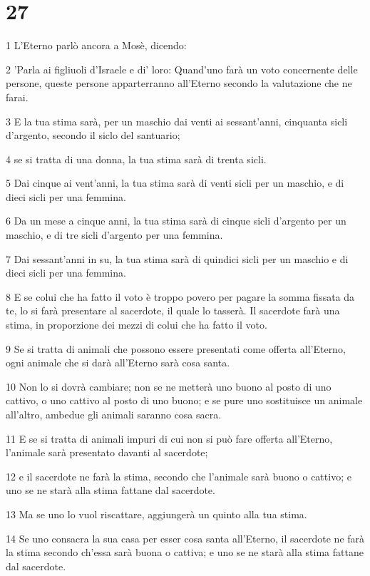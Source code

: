 \chapter{27}

\par 1 L'Eterno parlò ancora a Mosè, dicendo:
\par 2 'Parla ai figliuoli d'Israele e di' loro: Quand'uno farà un voto concernente delle persone, queste persone apparterranno all'Eterno secondo la valutazione che ne farai.
\par 3 E la tua stima sarà, per un maschio dai venti ai sessant'anni, cinquanta sicli d'argento, secondo il siclo del santuario;
\par 4 se si tratta di una donna, la tua stima sarà di trenta sicli.
\par 5 Dai cinque ai vent'anni, la tua stima sarà di venti sicli per un maschio, e di dieci sicli per una femmina.
\par 6 Da un mese a cinque anni, la tua stima sarà di cinque sicli d'argento per un maschio, e di tre sicli d'argento per una femmina.
\par 7 Dai sessant'anni in su, la tua stima sarà di quindici sicli per un maschio e di dieci sicli per una femmina.
\par 8 E se colui che ha fatto il voto è troppo povero per pagare la somma fissata da te, lo si farà presentare al sacerdote, il quale lo tasserà. Il sacerdote farà una stima, in proporzione dei mezzi di colui che ha fatto il voto.
\par 9 Se si tratta di animali che possono essere presentati come offerta all'Eterno, ogni animale che si darà all'Eterno sarà cosa santa.
\par 10 Non lo si dovrà cambiare; non se ne metterà uno buono al posto di uno cattivo, o uno cattivo al posto di uno buono; e se pure uno sostituisce un animale all'altro, ambedue gli animali saranno cosa sacra.
\par 11 E se si tratta di animali impuri di cui non si può fare offerta all'Eterno, l'animale sarà presentato davanti al sacerdote;
\par 12 e il sacerdote ne farà la stima, secondo che l'animale sarà buono o cattivo; e uno se ne starà alla stima fattane dal sacerdote.
\par 13 Ma se uno lo vuol riscattare, aggiungerà un quinto alla tua stima.
\par 14 Se uno consacra la sua casa per esser cosa santa all'Eterno, il sacerdote ne farà la stima secondo ch'essa sarà buona o cattiva; e uno se ne starà alla stima fattane dal sacerdote.
